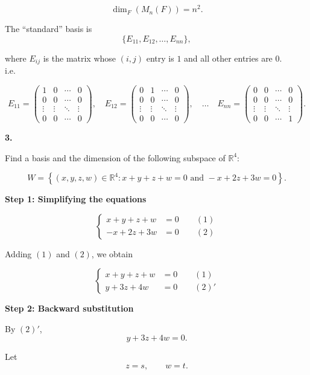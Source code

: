 \documentclass[12pt]{article}
\begin{document}
\[
\dim_F(M_n(F))=n^2.
\]

The ``standard'' basis is
\[
\{E_{11},E_{12},\ldots,E_{nn}\},
\]

where $E_{ij}$ is the matrix whose $(i,j)$ entry is $1$ and all other entries are $0$.\\
i.e.

\[
E_{11}
=
\begin{pmatrix}
1&0&\cdots&0\\
0&0&\cdots&0\\
\vdots&\vdots&\ddots&\vdots\\
0&0&\cdots&0
\end{pmatrix},
\quad
E_{12}
=
\begin{pmatrix}
0&1&\cdots&0\\
0&0&\cdots&0\\
\vdots&\vdots&\ddots&\vdots\\
0&0&\cdots&0
\end{pmatrix},
\quad
\ldots
\quad
E_{nn}
=
\begin{pmatrix}
0&0&\cdots&0\\
0&0&\cdots&0\\
\vdots&\vdots&\ddots&\vdots\\
0&0&\cdots&1
\end{pmatrix}.
\]

\newpage

\textbf{3.}

Find a basis and the dimension of the following subspace of $\mathbb{R}^4$:

\[
W=
\left\{
(x,y,z,w)\in\mathbb{R}^4 :
x+y+z+w=0
\text{ and }
-x+2z+3w=0
\right\}.
\]

\textbf{Step 1: Simplifying the equations}

\[
\left\{
\begin{aligned}
x+y+z+w &= 0 \qquad (1)\\
-x+2z+3w &= 0 \qquad (2)
\end{aligned}
\right.
\]

Adding $(1)$ and $(2)$, we obtain

\[
\left\{
\begin{aligned}
x+y+z+w &= 0 \qquad (1)\\
y+3z+4w &= 0 \qquad (2)'
\end{aligned}
\right.
\]

\bigskip

\textbf{Step 2: Backward substitution}

By $(2)'$,
\[
y+3z+4w=0.
\]

Let
\[
z=s,\qquad w=t.
\]
\end{document}
